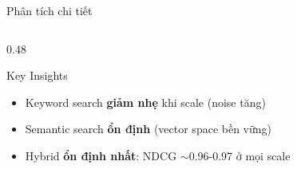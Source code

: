\begin{frame}{Phân tích chi tiết}
\begin{columns}[T]
\begin{column}{0.48\textwidth}
\vspace{0.05cm}

\begin{alertblock}{Key Insights}
{\scriptsize
\begin{itemize}\itemsep0pt \parskip0pt 
    \item Keyword search \textbf{giảm nhẹ} khi scale (noise tăng)
    \item Semantic search \textbf{ổn định} (vector space bền vững)
    \item Hybrid \textbf{ổn định nhất}: NDCG $\sim$0.96-0.97 ở mọi scale
\end{itemize}
}
\end{alertblock}

\end{column}
\end{columns}
\end{frame}
